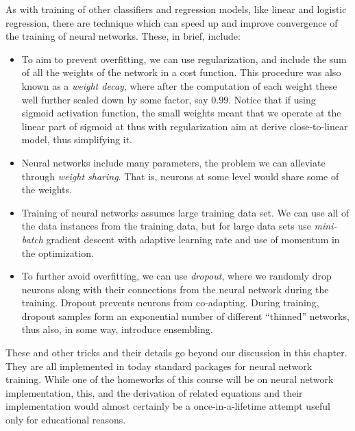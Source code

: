 \begin{refsection}
As with training of other classifiers and regression models, like linear and logistic regression, there are technique which can speed up and improve convergence of the training of neural networks. These, in brief, include:
\begin{itemize}
	\item To aim to prevent overfitting, we can use regularization, and include the sum of all the weights of the network in a cost function. This procedure was also known as a {\em weight decay}, where after the computation of each weight these well further scaled down by some factor, say $0.99$. Notice that if using sigmoid activation function, the small weights meant that we operate at the linear part of sigmoid at thus with regularization aim at derive close-to-linear model, thus simplifying it.
	\item Neural networks include many parameters, the problem we can alleviate through {\em weight sharing}. That is, neurons at some level would share some of the weights.
	\item Training of neural networks assumes large training data set. We can use all of the data instances from the training data, but for large data sets use {\em mini-batch} gradient descent with adaptive learning rate and use of momentum in the optimization.
	\item To further avoid overfitting, we can use {\em dropout}, where we randomly drop neurons along with their connections from the neural network during the training. Dropout prevents neurons from co-adapting. During training, dropout samples form an exponential number of different ``thinned'' networks, thus also, in some way, introduce ensembling.
\end{itemize}

These and other tricks and their details go beyond our discussion in this chapter. They are all implemented in today standard packages for neural network training. While one of the homeworks of this course will be on neural network implementation, this, and the derivation of related equations and their implementation would almost certainly be a once-in-a-lifetime attempt useful only for educational reasons.

\printbibliography[heading=subbibliography]
\end{refsection}
